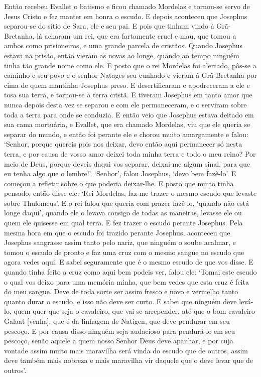Então recebeu Evallet o batismo e ficou chamado Mordelas e tornou-se servo de
Jesus Cristo e fez manter em honra o escudo. E depois aconteceu que Josephus
separou-se do sítio de Sara, ele e seu pai. E pois que tinham vindo à
Grã-Bretanha, lá acharam um rei, que era fartamente cruel e mau, que tomou a
ambos como prisioneiros, e uma grande parcela de cristãos. Quando Josephus
estava na prisão, então vieram as novas ao longe, quando ao tempo ninguém tinha
tão grande nome como ele. E posto que o rei Mordelas foi alertado, pôs-se a
caminho e seu povo e o senhor Natages seu cunhado e vieram à Grã-Bretanha por
cima de quem mantinha Josephus preso. E desertificaram e apodreceram a ele e
tosa sua terra, e tornou-se a terra cristã. E tiveram Josephus em tanto amor
que nunca depois desta vez se separou e com ele permaneceram, e o serviram
sobre toda a terra para onde se conduzia. E então veio que Josephus estava
deitado em sua cama mortuária, e Evallet, que era chamado Mordelas, viu que ele
queria se separar do mundo, e então foi perante ele e chorou muito amargamente
e falou: ‘Senhor, porque quereis pois nos deixar, devo então aqui permanecer só
nesta terra, e por causa de vosso amor  deixei toda minha terra e todo o meu
reino? Por meio de Deus, porque deveis daqui vos separar, deixai-me algum
sinal, para que eu tenha algo que o lembre!’. ‘Senhor’, falou Josephus, ‘devo
bem fazê-lo’. E começou a refletir sobre o que poderia deixar-lhe. E posto que
muito tinha pensado, então disse ele: ‘Rei Mordelas, faz-me trazer o mesmo
escudo que levaste sobre Thulomeus’. E o rei falou que queria com prazer
fazê-lo, ‘quando não está longe daqui’, quando ele o levava consigo de todas as
maneiras, levasse ele ou quem ele quisesse em qual terra. E fez trazer o escudo
perante Josephus. Pela mesma hora em que o escudo foi trazido perante Josephus,
aconteceu que Josephus sangrasse assim tanto pelo nariz, que ninguém o soube
acalmar, e tomou o escudo de pronto e faz uma cruz com o mesmo sangue no escudo
que agora vedes aqui. E sabei seguramente que é o mesmo escudo de que vos
disse. E quando tinha feito a cruz como aqui bem podeis ver, falou ele: ‘Tomai
este escudo o qual vos deixo para uma memória minha, que bem vedes que esta
cruz é feita do meu sangue. Deve de toda sorte ser assim fresco e novo e
vermelho tanto quanto durar o escudo, e isso não deve ser curto. E sabei que
ninguém deve levá-lo, quem quer que seja o cavaleiro, que vai se arrepender,
até que o bom cavaleiro Galaat [venha], que é da linhagem de Natigen, que deve
pendurar em seu pescoço. E por causa disso ninguém seja audacioso para
pendurá-lo em seu pescoço, senão aquele a quem nosso Senhor Deus  deve apanhar,
e por cuja vontade assim muito mais maravilha será vinda do escudo que de
outros, assim deve também mais nobreza e mais maravilha vir daquele que o deve
levar que de outros’. 

